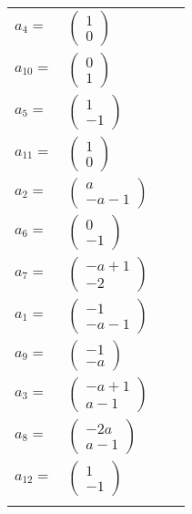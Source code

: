 \documentclass[1p]{elsarticle_modified}
\theoremstyle{definition}
\begin{document}
\begin{tabular}{m{7pt} m{180pt} m{7pt} m{180pt} }
\flushright $a_{4}=$&$\begin{pmatrix}1\\0\end{pmatrix}$ \\
\flushright $a_{10}=$&$\begin{pmatrix}0\\1\end{pmatrix}$ \\
\flushright $a_{5}=$&$\begin{pmatrix}1\\-1\end{pmatrix}$ \\
\flushright $a_{11}=$&$\begin{pmatrix}1\\0\end{pmatrix}$ \\
\flushright $a_{2}=$&$\begin{pmatrix}a\\- a-1\end{pmatrix}$ \\
\flushright $a_{6}=$&$\begin{pmatrix}0\\-1\end{pmatrix}$ \\
\flushright $a_{7}=$&$\begin{pmatrix}- a+1\\-2\end{pmatrix}$ \\
\flushright $a_{1}=$&$\begin{pmatrix}-1\\- a-1\end{pmatrix}$ \\
\flushright $a_{9}=$&$\begin{pmatrix}-1\\- a\end{pmatrix}$ \\
\flushright $a_{3}=$&$\begin{pmatrix}- a+1\\a-1\end{pmatrix}$ \\
\flushright $a_{8}=$&$\begin{pmatrix}-2 a\\a-1\end{pmatrix}$ \\
\flushright $a_{12}=$&$\begin{pmatrix}1\\-1\end{pmatrix}$\\&\end{tabular}
\end{document}
